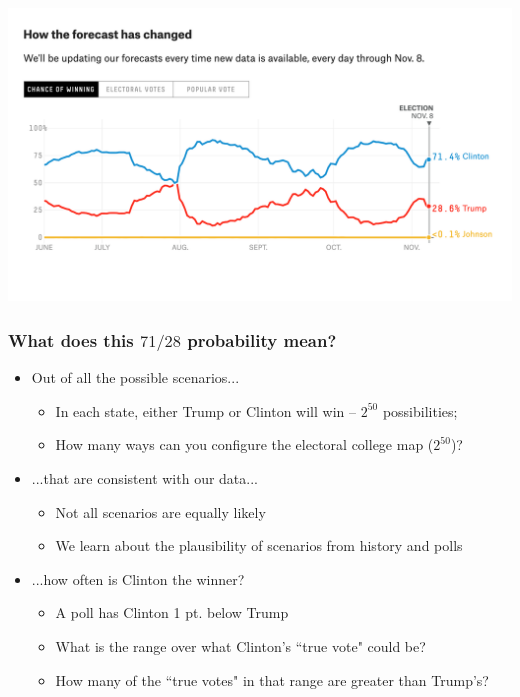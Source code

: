 \documentclass[aspectratio=169]{beamer}
\theoremstyle{principle}
\begin{document}
\begin{frame}

\begin{center}
\includegraphics[scale=0.4]{forecast-win.png}
\end{center}

\end{frame}

\begin{frame}
\frametitle{What does this $71/28$ probability mean?}

\begin{itemize}
\item Out of all the possible scenarios...
\begin{itemize}
\item In each state, either Trump or Clinton will win -- $2^{50}$ possibilities;
\item How many ways can you configure the electoral college map ($2^{50}$)?
\end{itemize}
\bigskip
\bigskip

\item ...that are consistent with our data...
\begin{itemize}
\item Not all scenarios are equally likely
\item We learn about the plausibility of scenarios from history and polls
\end{itemize}
\bigskip
\bigskip

\item ...how often is Clinton the winner?
\begin{itemize}
\item A poll has Clinton 1 pt. below Trump
\item What is the range over what Clinton's ``true vote" could be?
\item How many of the ``true votes" in that range are greater than Trump's?
\end{itemize}
\end{itemize}
\end{frame}
\end{document}
